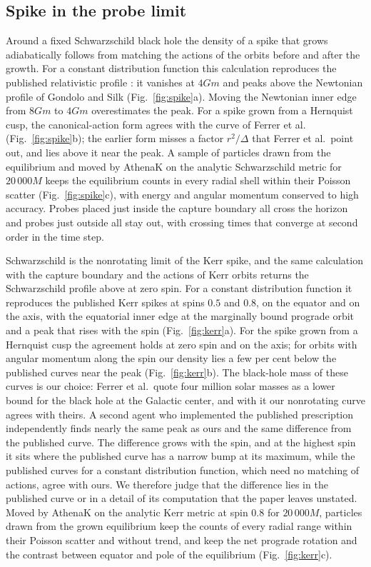 \documentclass[aps,prd,twocolumn,10pt,superscriptaddress,nofootinbib,longbibliography,floatfix]{revtex4-2}
\begin{document}
\subsection{Spike in the probe limit}

Around a fixed Schwarzschild black hole the density of a spike that grows adiabatically follows from matching the actions of the orbits before and after the growth. For a constant distribution function this calculation reproduces the published relativistic profile \cite{Sadeghian:2013spike}: it vanishes at $4Gm$ and peaks above the Newtonian profile of Gondolo and Silk (Fig.~\ref{fig:spike}a). Moving the Newtonian inner edge from $8Gm$ to $4Gm$ overestimates the peak. For a spike grown from a Hernquist cusp, the canonical-action form agrees with the curve of Ferrer et al.\ \cite{Ferrer:2017kerr} (Fig.~\ref{fig:spike}b); the earlier form misses a factor $r^2/\Delta$ that Ferrer et al.\ point out, and lies above it near the peak. A sample of particles drawn from the equilibrium and moved by AthenaK on the analytic Schwarzschild metric for $20\,000M$ keeps the equilibrium counts in every radial shell within their Poisson scatter (Fig.~\ref{fig:spike}c), with energy and angular momentum conserved to high accuracy. Probes placed just inside the capture boundary all cross the horizon and probes just outside all stay out, with crossing times that converge at second order in the time step.

Schwarzschild is the nonrotating limit of the Kerr spike, and the same calculation with the capture boundary and the actions of Kerr orbits \cite{Ferrer:2017kerr} returns the Schwarzschild profile above at zero spin. For a constant distribution function it reproduces the published Kerr spikes at spins $0.5$ and $0.8$, on the equator and on the axis, with the equatorial inner edge at the marginally bound prograde orbit and a peak that rises with the spin (Fig.~\ref{fig:kerr}a). For the spike grown from a Hernquist cusp the agreement holds at zero spin and on the axis; for orbits with angular momentum along the spin our density lies a few per cent below the published curves near the peak (Fig.~\ref{fig:kerr}b). The black-hole mass of these curves is our choice: Ferrer et al.\ quote four million solar masses as a lower bound for the black hole at the Galactic center, and with it our nonrotating curve agrees with theirs. A second agent who implemented the published prescription independently finds nearly the same peak as ours and the same difference from the published curve. The difference grows with the spin, and at the highest spin it sits where the published curve has a narrow bump at its maximum, while the published curves for a constant distribution function, which need no matching of actions, agree with ours. We therefore judge that the difference lies in the published curve or in a detail of its computation that the paper leaves unstated. Moved by AthenaK on the analytic Kerr metric at spin $0.8$ for $20\,000M$, particles drawn from the grown equilibrium keep the counts of every radial range within their Poisson scatter and without trend, and keep the net prograde rotation and the contrast between equator and pole of the equilibrium (Fig.~\ref{fig:kerr}c).
\end{document}
